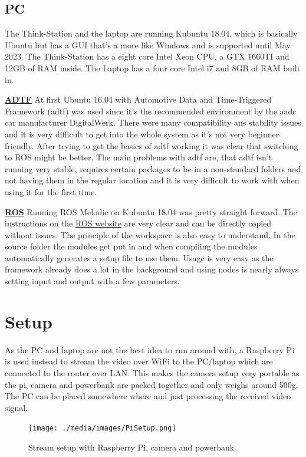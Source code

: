 \subsection{PC}
The Think-Station and the laptop are running Kubuntu 18.04, which is basically Ubuntu but has a GUI that's a more like Windows and is supported until May 2023. \newline
The Think-Station has a eight core Intel Xeon CPU, a GTX 1660TI and 12GB of RAM inside. \newline
The Laptop has a four core Intel i7 and 8GB of RAM built in.\newline

\textbf{\underline{ADTF}} \newline
At first Ubuntu 16.04 with Automotive Data and Time-Triggered Framework (\gls{adtf}) was used since it's the recommended environment by the \gls{aadc} car manufacturer DigitalWerk. There were many compatibility ans stability issues and it is very difficult to get into the whole system as it's not very beginner friendly. After trying to get the basics of \gls{adtf} working it was clear that switching to ROS might be better. The main problems with \gls{adtf} are, that \gls{adtf} isn't running very stable, requires certain packages to be in a non-standard folders and not having them in the regular location and it is very difficult to work with when using it for the first time.

\textbf{\underline{ROS}} \newline
Running ROS Melodic on Kubuntu 18.04 was pretty straight forward. The instructions on the \href{https://wiki.ros.org/melodic/Installation}{ROS website} \cite{installros} are very clear and can be directly copied without issues. The principle of the workspace is also easy to understand. In the source folder the modules get put in and when compiling the modules automatically generates a setup file to use them. Usage is very easy as the framework already does a lot in the background and using nodes is nearly always setting input and output with a few parameters.


\section{Setup\authorA}
As the PC and laptop are not the best idea to run around with, a Raspberry Pi is used instead to stream the video over WiFi to the PC/laptop which are connected to the router over LAN. This makes the camera setup very portable as the pi, camera and powerbank are packed together and only weighs around 500g. The PC can be placed somewhere where and just processing the received video signal.\newline
\begin{figure}[h]
	\centering
	\texttt{[image: ./media/images/PiSetup.png]}
  	\caption{Stream setup with Raspberry Pi, camera and powerbank}
  	\label{picamssetup}
\end{figure}

